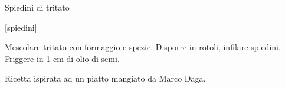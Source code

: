 \begin{recipe}{Spiedini di tritato}
    \begin{header}
        [spiedini]

    \end{header}

    \begin{ingredients}[5]
    \end{ingredients}

    \begin{preparation}
        \step Mescolare tritato con formaggio e spezie.
        \step Disporre in rotoli, infilare spiedini.
        \step Friggere in 1 cm di olio di semi.
    \end{preparation}

    \begin{hint}
        Ricetta ispirata ad un piatto mangiato da Marco Daga.
    \end{hint}
\end{recipe}
